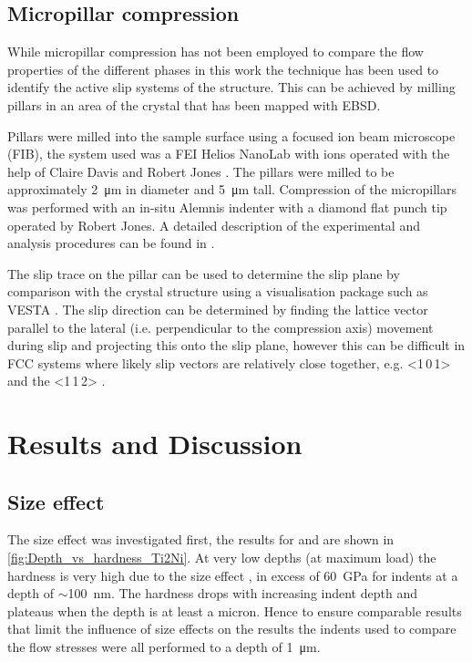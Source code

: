 
\subsection{Micropillar compression}

While micropillar compression has not been employed to compare the flow properties of the different phases in this work the technique has been used to identify the active slip systems of the  structure. This can be achieved by milling pillars in an area of the crystal that has been mapped with EBSD. 

Pillars were milled into the sample surface using a focused ion beam microscope (FIB), the system used was a FEI Helios NanoLab with  ions operated with the help of Claire Davis \cite{Davis2015} and Robert Jones \cite{Jones2016}. The pillars were milled to be approximately \SI{2}{\micro\meter} in diameter and \SI{5}{\micro\meter} tall. Compression of the micropillars was performed with an in-situ Alemnis indenter with a diamond flat punch tip operated by Robert Jones. A detailed description of the experimental and analysis procedures can be found in \cite{Davis2015}.

The slip trace on the pillar can be used to determine the slip plane by comparison with the crystal structure using a visualisation package such as VESTA \cite{Momma2011,Davis2015}. The slip direction can be determined by finding the lattice vector parallel to the lateral (i.e. perpendicular to the compression axis) movement during slip and projecting this onto the slip plane, however this can be difficult in FCC systems where likely slip vectors are relatively close together, e.g. <1\,0\,1> and the <1\,1\,2> \cite{Davis2015}.


\section{Results and Discussion}


\subsection{Size effect}


The size effect was investigated first, the results for  and  are shown in \autoref{fig:Depth_vs_hardness_Ti2Ni}. At very low depths (at maximum load) the hardness is very high due to the size effect \cite{Cripps2011}, in excess of \SI{60}{\giga\pascal} for indents at a depth of $\sim$\SI{100}{\nano\meter}. The hardness drops with increasing indent depth and plateaus when the depth is at least a micron. Hence to ensure comparable results that limit the influence of size effects on the results the indents used to compare the flow stresses were all performed to a depth of \SI{1}{\micro\meter}. 

